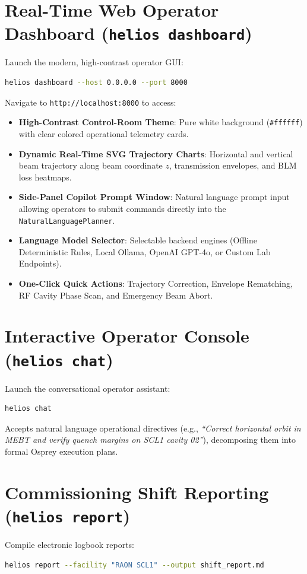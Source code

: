 \documentclass[11pt,a4paper]{report}
\begin{document}
\section{Real-Time Web Operator Dashboard (\texttt{helios dashboard})}
Launch the modern, high-contrast operator GUI:
\begin{lstlisting}[language=bash]
helios dashboard --host 0.0.0.0 --port 8000
\end{lstlisting}
Navigate to \texttt{http://localhost:8000} to access:
\begin{itemize}
    \item \textbf{High-Contrast Control-Room Theme}: Pure white background (\texttt{\#ffffff}) with clear colored operational telemetry cards.
    \item \textbf{Dynamic Real-Time SVG Trajectory Charts}: Horizontal and vertical beam trajectory along beam coordinate $z$, transmission envelopes, and BLM loss heatmaps.
    \item \textbf{Side-Panel Copilot Prompt Window}: Natural language prompt input allowing operators to submit commands directly into the \texttt{NaturalLanguagePlanner}.
    \item \textbf{Language Model Selector}: Selectable backend engines (Offline Deterministic Rules, Local Ollama, OpenAI GPT-4o, or Custom Lab Endpoints).
    \item \textbf{One-Click Quick Actions}: Trajectory Correction, Envelope Rematching, RF Cavity Phase Scan, and Emergency Beam Abort.
\end{itemize}

\section{Interactive Operator Console (\texttt{helios chat})}
Launch the conversational operator assistant:
\begin{lstlisting}[language=bash]
helios chat
\end{lstlisting}
Accepts natural language operational directives (e.g., \textit{``Correct horizontal orbit in MEBT and verify quench margins on SCL1 cavity 02''}), decomposing them into formal Osprey execution plans.

\section{Commissioning Shift Reporting (\texttt{helios report})}
Compile electronic logbook reports:
\begin{lstlisting}[language=bash]
helios report --facility "RAON SCL1" --output shift_report.md
\end{lstlisting}
\end{document}
